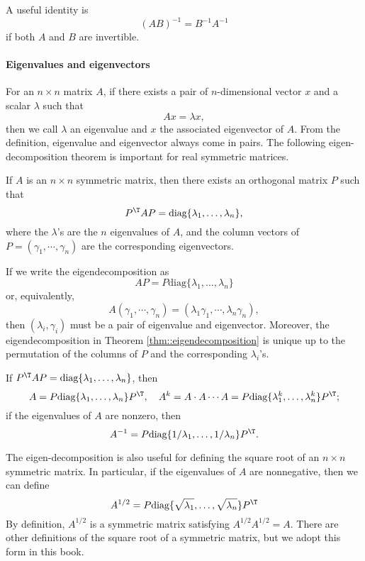 A useful identity is
$$
(AB)^{-1}  = B^{-1} A^{-1}
$$
if both $A$ and $B$ are invertible. 



\paragraph*{Eigenvalues and eigenvectors}

For an $n\times n$ matrix $A$, if there exists a pair of $n$-dimensional
vector $x$ and a scalar $\lambda$ such that 
$$
Ax=\lambda x,
$$ 
then we call $\lambda$ an eigenvalue and $x$ the associated eigenvector of $A$. From
the definition, eigenvalue and eigenvector always come in pairs. The
following eigen-decomposition theorem is important for real symmetric
matrices.

\begin{theorem}\label{thm::eigendecomposition}
If $A$ is an $n\times n$ symmetric matrix, then there exists
an orthogonal matrix $P$ such that 
\[
P^{\T}AP=\textup{diag}\{\lambda_{1},\ldots,\lambda_{n}\},
\]
where the $\lambda$'s are the $n$ eigenvalues of $A$, and the column vectors of $P=(\gamma_{1},\cdots,\gamma_{n})$ are the corresponding eigenvectors. 
\end{theorem}

If we write the eigendecomposition as 
$$
AP=P\text{diag}\{\lambda_{1},\ldots,\lambda_{n}\}
$$
or, equivalently,
$$
A(\gamma_{1},\cdots,\gamma_{n}) = (\lambda_1 \gamma_{1},\cdots, \lambda_{n}\gamma_{n}),
$$
then $(\lambda_i,\gamma_i)$ must be a pair of eigenvalue and eigenvector. Moreover, the eigendecomposition in Theorem \ref{thm::eigendecomposition} is unique up to the permutation of the columns of $P$ and the corresponding $\lambda_i$'s. 

\begin{corollary}
If $P^{\T}AP=\textup{diag}\{\lambda_{1},\ldots,\lambda_{n}\}$, then 
$$
A=P\textup{diag}\{\lambda_{1},\ldots,\lambda_{n}\}P^{\T},\quad 
A^{k}=A\cdot A\cdots A=P\textup{diag}\{\lambda_{1}^{k},\ldots,\lambda_{n}^{k}\}P^{\T};
$$
if the eigenvalues of $A$ are nonzero, then 
$$A^{-1}=P\textup{diag}\{1/\lambda_{1},\ldots,1/\lambda_{n}\}P^{\T}.$$
\end{corollary}


The eigen-decomposition is also useful for defining the square root
of an $n\times n$ symmetric matrix. In particular, if the eigenvalues
of $A$ are nonnegative, then we can define
\[
A^{1/2}=P\text{diag}\{\sqrt{\lambda_{1}},\ldots,\sqrt{\lambda_{n}}\}P^{\T}
\]
By definition, $A^{1/2}$ is a symmetric matrix satisfying $A^{1/2}A^{1/2}=A.$
There are other definitions of the square root of a symmetric matrix,
but we adopt this form in this book.

